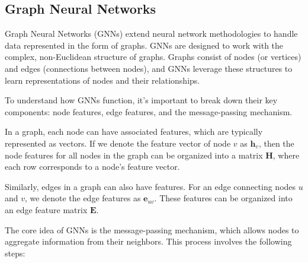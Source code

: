 \subsection{Graph Neural Networks}

Graph Neural Networks (GNNs) extend neural network methodologies to handle data represented in the form of graphs.
GNNs are designed to work with the complex, non-Euclidean structure of graphs.
Graphs consist of nodes (or vertices) and edges (connections between nodes), and GNNs leverage these structures to learn representations of nodes and their relationships.

To understand how GNNs function, it's important to break down their key components: node features, edge features, and the message-passing mechanism.

In a graph, each node can have associated features, which are typically represented as vectors.
If we denote the feature vector of node \( v \) as \( \mathbf{h}_v \), then the node features for all nodes in the graph can be organized into a matrix \( \mathbf{H} \), where each row corresponds to a node's feature vector.

Similarly, edges in a graph can also have features.
For an edge connecting nodes \( u \) and \( v \), we denote the edge features as \( \mathbf{e}_{uv} \).
These features can be organized into an edge feature matrix \( \mathbf{E} \).

The core idea of GNNs is the message-passing mechanism, which allows nodes to aggregate information from their neighbors.
This process involves the following steps:


